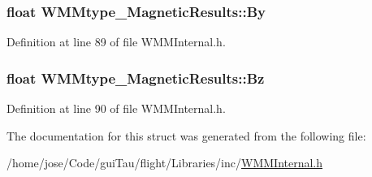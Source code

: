 \hypertarget{struct_w_m_mtype___magnetic_results_aa6dcc4f5525f563fd38032ca8ffbf02d}{
\subsubsection[{By}]{\setlength{\rightskip}{0pt plus 5cm}float W\-M\-Mtype\-\_\-\-Magnetic\-Results\-::\-By}}\label{struct_w_m_mtype___magnetic_results_aa6dcc4f5525f563fd38032ca8ffbf02d}


Definition at line 89 of file W\-M\-M\-Internal.\-h.

\hypertarget{struct_w_m_mtype___magnetic_results_acdc0be68c71feef834382316e7ea69de}{
\subsubsection[{Bz}]{\setlength{\rightskip}{0pt plus 5cm}float W\-M\-Mtype\-\_\-\-Magnetic\-Results\-::\-Bz}}\label{struct_w_m_mtype___magnetic_results_acdc0be68c71feef834382316e7ea69de}


Definition at line 90 of file W\-M\-M\-Internal.\-h.



The documentation for this struct was generated from the following file\-:\begin{DoxyCompactItemize}
\item 
/home/jose/\-Code/gui\-Tau/flight/\-Libraries/inc/\hyperlink{_w_m_m_internal_8h}{W\-M\-M\-Internal.\-h}\end{DoxyCompactItemize}
